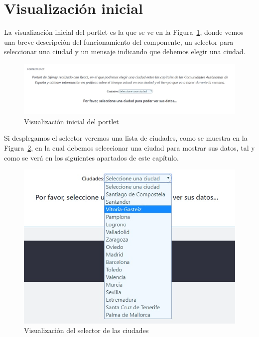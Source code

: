 \documentclass[a4paper, 12pt]{book}
\begin{document}
\section{Visualización inicial}
\label{sec:visualizacion-inicial}
La visualización inicial del portlet es la que se ve en la Figura~\ref{fig:pantalla_ini}, donde vemos una breve descripción del funcionamiento del componente, un selector para seleccionar una ciudad y un mensaje indicando que debemos elegir una ciudad.
\begin{figure}[h]
  \centering
  \includegraphics[width=15cm]{img_usadas/pantalla_ini.png}
  \caption{Visualización inicial del portlet}
  \label{fig:pantalla_ini}
\end{figure}

\vspace{5mm}
Si desplegamos el selector veremos una lista de ciudades, como se muestra en la Figura~\ref{fig:seleccion_ciudad}, en la cual debemos seleccionar una ciudad para mostrar sus datos, tal y como se verá en los siguientes apartados de este capítulo.
\begin{figure}[h]
  \centering
  \includegraphics{img_usadas/seleccion_ciudad.png}
  \caption{Visualización del selector de las ciudades}
  \label{fig:seleccion_ciudad}
\end{figure}
\end{document}
